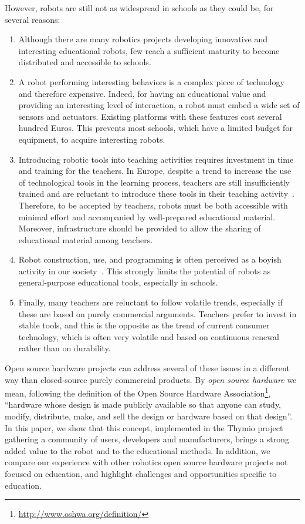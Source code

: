 \documentclass[letterpaper, 10 pt, conference]{ieeeconf}  %
\begin{document}
However, robots are still not as widespread in schools as they could be, for several reasons:
\begin{enumerate}
\item Although there are many robotics projects developing innovative and interesting educational robots, few reach a sufficient maturity to become distributed and accessible to schools. 
\item A robot performing interesting behaviors is a complex piece of technology and therefore expensive. 
Indeed, for having an educational value and providing an interesting level of interaction, a robot must embed a wide set of sensors and actuators.
Existing platforms with these features cost several hundred Euros.
This prevents most schools, which have a limited budget for equipment, to acquire interesting robots.
\item Introducing robotic tools into teaching activities requires investment in time and training for the teachers.
In Europe, despite a trend to increase the use of technological tools in the learning process, teachers are still insufficiently trained and are reluctant to introduce these tools in their teaching activity~\cite{CERI2008}.
Therefore, to be accepted by teachers, robots must be both accessible with minimal effort and accompanied by well-prepared educational material. 
Moreover, infrastructure should be provided to allow the sharing of educational material among teachers.
\item Robot construction, use, and programming is often perceived as a boyish activity in our society~\cite{leonard2009lego,nourbakhsh2009robot}.
This strongly limits the potential of robots as general-purpose educational tools, especially in schools.
\item Finally, many teachers are reluctant to follow volatile trends, especially if these are based on purely commercial arguments.
Teachers prefer to invest in stable tools, and this is the opposite as the trend of current consumer technology, which is often very volatile and based on continuous renewal rather than on durability.
\end{enumerate}

Open source hardware projects can address several of these issues in a different way than closed-source purely commercial products. 
By \textit{open source hardware} we mean, following the definition of the Open Source Hardware Association\footnote{\url{http://www.oshwa.org/definition/}}, ``hardware whose design is made publicly available so that anyone can study, modify, distribute, make, and sell the design or hardware based on that design''.
In this paper, we show that this concept, implemented in the Thymio project gathering a community of users, developers and manufacturers, brings a strong added value to the robot and to the educational methods.
In addition, we compare our experience with other robotics open source hardware projects not focused on education, and highlight challenges and opportunities specific to education.
\end{document}
